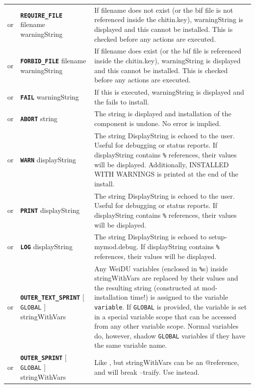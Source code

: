 \documentclass{article}
\def\ttref#1{\ahrefloc{#1}{\tt #1}}
\def\DEFINE#1{{\tt \bf #1}\label{#1}\index{#1}}
\def\t#1{{\tt #1}}
\def\Ob{{\color{red} [ }}
\def\Oe{{\color{red} ] }}
\begin{document}
\begin{tabular}{cp{10in}|p{10in}}
  or & \DEFINE{REQUIRE_FILE} filename warningString &
    If filename does not exist (or the bif file is not referenced inside
    the chitin.key), warningString is displayed and this
    \ttref{component} cannot be installed. This is checked before any
    actions are executed. \\
  or & \DEFINE{FORBID_FILE} filename warningString &
    If filename does exist (or the bif file is referenced inside
    the chitin.key), warningString is displayed and this
    \ttref{component} cannot be installed. This is checked before any
    actions are executed. \\
  or & \DEFINE{FAIL} warningString &
    If this \ttref{TP2 Action} is executed, warningString is displayed and
    the \ttref{component} fails to install. \\
  or & \DEFINE{ABORT} string &
    The string is displayed and installation of the component is undone.
    No error is implied. \\
  or & \DEFINE{WARN} displayString &
    The string DisplayString is echoed to the user. Useful for debugging or
    status reports. If displayString contains \t{\%}\ttref{variable}\t{\%}
    references, their values will be displayed. Additionally, INSTALLED WITH
    WARNINGS is printed at the end of the install.
    \\
  or & \DEFINE{PRINT} displayString &
    The string DisplayString is echoed to the user. Useful for debugging or
    status reports. If displayString contains \t{\%}\ttref{variable}\t{\%}
    references, their values will be displayed. \\
  or & \DEFINE{LOG} displayString &
    The string DisplayString is echoed to setup-mymod.debug.
    If displayString contains \t{\%}\ttref{variable}\t{\%}
    references, their values will be displayed. \\
or & \DEFINE{OUTER_TEXT_SPRINT} \Ob \t{GLOBAL} \Oe \ttref{variable} stringWithVars &
  Any WeiDU variables (enclosed in \t{\%}s) inside stringWithVars are
  replaced by their values and the resulting string (constructed at
  mod-installation time!) is assigned to the variable \t{variable}. If
  \t{GLOBAL} is provided, the variable is set in a special variable
  scope that can be accessed from any other variable scope. Normal
  variables do, however, shadow \t{GLOBAL} variables if they have the
  same variable name. \\
or & \DEFINE{OUTER_SPRINT} \Ob \t{GLOBAL} \Oe \ttref{variable} stringWithVars &
  Like \ttref{OUTER_TEXT_SPRINT}, but stringWithVars can be an @reference, and will
  break --traify. Use \ttref{OUTER_TEXT_SPRINT} instead. \\


\end{tabular}
\end{document}
